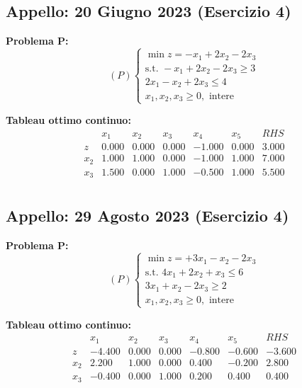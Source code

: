 \documentclass[11pt, a4paper]{article}
\begin{document}
\subsection{Appello: 20 Giugno 2023 (Esercizio 4)}
\textbf{Problema P:}
\[ (P) \begin{cases} \min z = -x_1 + 2x_2 - 2x_3 \\ \text{s.t. } -x_1 + 2x_2 - 2x_3 \ge 3 \\ 2x_1 - x_2 + 2x_3 \le 4 \\ x_1, x_2, x_3 \ge 0, \text{ intere} \end{cases} \]

\textbf{Tableau ottimo continuo:}
\[ \begin{array}{c|ccccc|c}
& x_1 & x_2 & x_3 & x_4 & x_5 & RHS \\ \hline
z & 0.000 & 0.000 & 0.000 & -1.000 & 0.000 & 3.000 \\ \hline
x_2 & 1.000 & 1.000 & 0.000 & -1.000 & 1.000 & 7.000 \\
x_3 & 1.500 & 0.000 & 1.000 & -0.500 & 1.000 & 5.500 \\
\end{array} \]

\subsection{Appello: 29 Agosto 2023 (Esercizio 4)}
\textbf{Problema P:}
\[ (P) \begin{cases} \min z = +3x_1 - x_2 - 2x_3 \\ \text{s.t. } 4x_1 + 2x_2 + x_3 \le 6 \\ 3x_1 + x_2 - 2x_3 \ge 2 \\ x_1, x_2, x_3 \ge 0, \text{ intere} \end{cases} \]

\textbf{Tableau ottimo continuo:}
\[ \begin{array}{c|ccccc|c}
& x_1 & x_2 & x_3 & x_4 & x_5 & RHS \\ \hline
z & -4.400 & 0.000 & 0.000 & -0.800 & -0.600 & -3.600 \\ \hline
x_2 & 2.200 & 1.000 & 0.000 & 0.400 & -0.200 & 2.800 \\
x_3 & -0.400 & 0.000 & 1.000 & 0.200 & 0.400 & 0.400 \\
\end{array} \]
\end{document}
